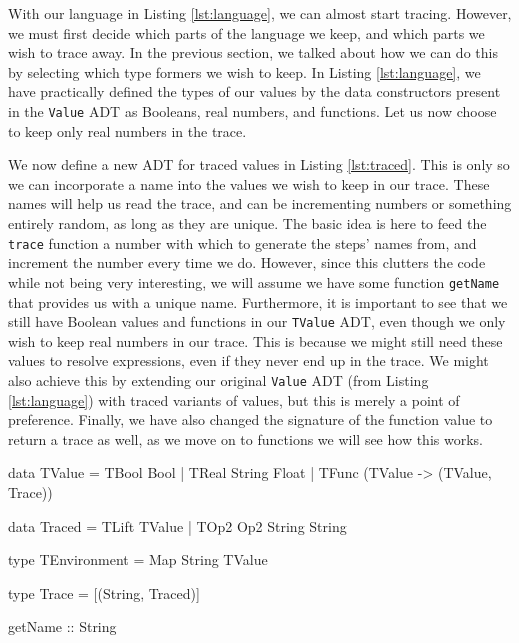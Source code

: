        With our language in Listing \ref{lst:language}, we can almost start tracing.
        However, we must first decide which parts of the language we keep, and which parts we wish to trace away.
        In the previous section, we talked about how we can do this by selecting which type formers we wish to keep.
        In Listing \ref{lst:language}, we have practically defined the types of our values by the data constructors present in the \texttt{Value} ADT as Booleans, real numbers, and functions.
        Let us now choose to keep only real numbers in the trace.

        We now define a new ADT for traced values in Listing \ref{lst:traced}.
        This is only so we can incorporate a name into the values we wish to keep in our trace.
        These names will help us read the trace, and can be incrementing numbers or something entirely random, as long as they are unique.
        The basic idea is here to feed the \texttt{trace} function a number with which to generate the steps' names from, and increment the number every time we do.
        However, since this clutters the code while not being very interesting, we will assume we have some function \texttt{getName} that provides us with a unique name.
        Furthermore, it is important to see that we still have Boolean values and functions in our \texttt{TValue} ADT, even though we only wish to keep real numbers in our trace.
        This is because we might still need these values to resolve expressions, even if they never end up in the trace.
        We might also achieve this by extending our original \texttt{Value} ADT (from Listing \ref{lst:language}) with traced variants of values, but this is merely a point of preference.
        Finally, we have also changed the signature of the function value to return a trace as well, as we move on to functions we will see how this works.
        
        \begin{haskell}[caption=Basic trace building blocks, label=lst:traced, gobble=12]
            data TValue = TBool Bool
                        | TReal String Float
                        | TFunc (TValue -> (TValue, Trace))

            data Traced = TLift TValue | TOp2 Op2 String String
            
            type TEnvironment = Map String TValue

            type Trace = [(String, Traced)]

            getName :: String
        \end{haskell}

